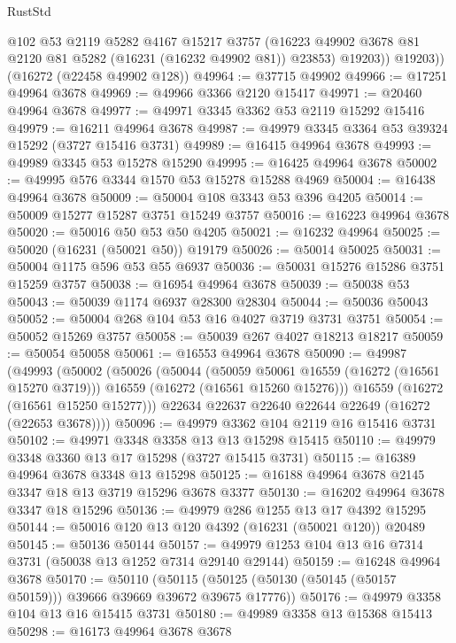 \begin{lexlean}{RustStd}
\begin{coremodule}
            @102
            @53
            @2119
            @5282
            @4167
            @15217
            @3757
            (@16223 @49902 @3678 @81 @2120 @81 @5282 (@16231 (@16232 @49902 @81)) @23853)
            @19203))
        @19203))
    (@16272 (@22458 @49902 @128))
@49964 := @37715 @49902
@49966 := @17251 @49964 @3678
@49969 := @49966 @3366 @2120 @15417
@49971 := @20460 @49964 @3678
@49977 := @49971 @3345 @3362 @53 @2119 @15292 @15416
@49979 := @16211 @49964 @3678
@49987 := @49979 @3345 @3364 @53 @39324 @15292 (@3727 @15416 @3731)
@49989 := @16415 @49964 @3678
@49993 := @49989 @3345 @53 @15278 @15290
@49995 := @16425 @49964 @3678
@50002 := @49995 @576 @3344 @1570 @53 @15278 @15288 @4969
@50004 := @16438 @49964 @3678
@50009 := @50004 @108 @3343 @53 @396 @4205
@50014 := @50009 @15277 @15287 @3751 @15249 @3757
@50016 := @16223 @49964 @3678
@50020 := @50016 @50 @53 @50 @4205
@50021 := @16232 @49964
@50025 := @50020 (@16231 (@50021 @50)) @19179
@50026 := @50014 @50025
@50031 := @50004 @1175 @596 @53 @55 @6937
@50036 := @50031 @15276 @15286 @3751 @15259 @3757
@50038 := @16954 @49964 @3678
@50039 := @50038 @53
@50043 := @50039 @1174 @6937 @28300 @28304
@50044 := @50036 @50043
@50052 := @50004 @268 @104 @53 @16 @4027 @3719 @3731 @3751
@50054 := @50052 @15269 @3757
@50058 := @50039 @267 @4027 @18213 @18217
@50059 := @50054 @50058
@50061 := @16553 @49964 @3678
@50090 := @49987
    (@49993
      (@50002
        (@50026
          (@50044
            (@50059 @50061 @16559 (@16272 (@16561 @15270 @3719)))
            @16559
            (@16272 (@16561 @15260 @15276)))
          @16559
          (@16272 (@16561 @15250 @15277)))
        @22634
        @22637
        @22640
        @22644
        @22649
        (@16272 (@22653 @3678))))
@50096 := @49979 @3362 @104 @2119 @16 @15416 @3731
@50102 := @49971 @3348 @3358 @13 @13 @15298 @15415
@50110 := @49979 @3348 @3360 @13 @17 @15298 (@3727 @15415 @3731)
@50115 := @16389 @49964 @3678 @3348 @13 @15298
@50125 := @16188 @49964 @3678 @2145 @3347 @18 @13 @3719 @15296 @3678 @3377
@50130 := @16202 @49964 @3678 @3347 @18 @15296
@50136 := @49979 @286 @1255 @13 @17 @4392 @15295
@50144 := @50016 @120 @13 @120 @4392 (@16231 (@50021 @120)) @20489
@50145 := @50136 @50144
@50157 := @49979 @1253 @104 @13 @16 @7314 @3731 (@50038 @13 @1252 @7314 @29140 @29144)
@50159 := @16248 @49964 @3678
@50170 := @50110
    (@50115 (@50125 (@50130 (@50145 (@50157 @50159))) @39666 @39669 @39672 @39675 @17776))
@50176 := @49979 @3358 @104 @13 @16 @15415 @3731
@50180 := @49989 @3358 @13 @15368 @15413
@50298 := @16173
    @49964
    @3678
    @3678

\end{coremodule}
\end{lexlean}
